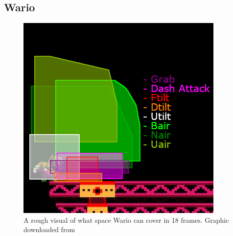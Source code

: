\subsection{Wario}

\begin{figure}[h]
    \centering
    \includegraphics[width=.4\textwidth]{images/threat-ranges/wario}
    \caption{A rough visual of what space Wario can cover in 18 frames. Graphic downloaded from\cite{ref:zovrah:threat-range:wario}}
\end{figure}

